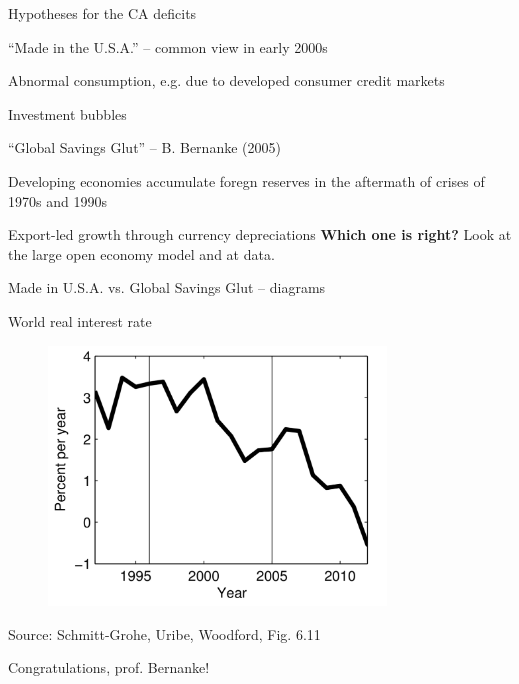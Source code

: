 \documentclass{beamer}
\newenvironment{mytemize}
{\vfill\itemize[nolistsep,itemsep=\fill,label=\color{blue}{$\triangleright$}]}
  {\enditemize}
\newenvironment{mynumerate}
{\vfill\enumerate[nolistsep,itemsep=\fill,label=\arabic*.]}
  {\endenumerate}
\begin{document}
\begin{frame}{Hypotheses for the CA deficits}
  \begin{mynumerate}
  \item ``Made in the U.S.A.'' -- common view in early 2000s
	\begin{mytemize}
	\item Abnormal consumption, e.g. due to developed consumer credit markets
	\item Investment bubbles
	\end{mytemize}
  \item ``Global Savings Glut'' -- B. Bernanke (2005)
	\begin{mytemize}
	\item Developing economies accumulate foregn reserves in the aftermath of crises of 1970s and 1990s
	\item Export-led growth through currency depreciations
	\end{mytemize}
  \end{mynumerate}
  \vfill
  \textbf{Which one is right?} Look at the large open economy model and at data.
\end{frame}

\begin{frame}{Made in U.S.A. vs. Global Savings Glut -- diagrams} 
  
\end{frame}

\begin{frame}{World real interest rate}
  \begin{figure}
	\centering
	\includegraphics[width = 0.8\textwidth]{FIGURES/world_int_rate.png}
  \end{figure}
  \vspace{-0.5cm}
  \begin{minipage}{\columnwidth}
  \footnotesize
  Source: Schmitt-Grohe, Uribe, Woodford, Fig. 6.11
  \end{minipage}
  \centering
  \alert{Congratulations, prof. Bernanke!}
\end{frame}
\end{document}

